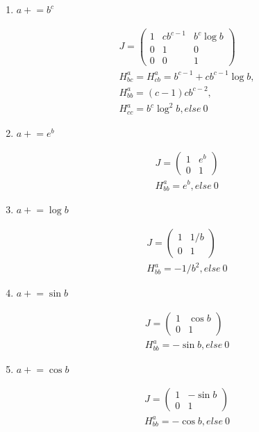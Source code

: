\documentclass{article}
\newcommand{\<}{\langle}
\renewcommand{\>}{\rangle}
\theoremstyle{definition}\newtheorem{definition}{\textit{Definition}}
\begin{document}
\begin{multicols}{2}
\begin{enumerate}
\item $a\mathrel+=b^c$


\begin{align*}
    &J = \left(\begin{matrix}
1 &  cb^{c-1} &   b^c \log b \\
0 & 1 & 0\\
0 & 0 & 1
\end{matrix}\right)\\
    &H^a_{bc} = H^a_{cb} = b^{c-1} + c b^{c-1}\log b,\\
    &H^a_{bb} = (c-1)c b^{c-2},\\
    &H^a_{cc} = b^c\log^2b, else ~0
\end{align*}

\item $a\mathrel+=e^b$

\begin{align*}
    &J = \left(\begin{matrix}
1 &  e^b \\
0 & 1
\end{matrix}\right)\\
    &H^a_{bb} = e^b, else ~0
\end{align*}

\item $a\mathrel+=\log b$

\begin{align*}
    &J = \left(\begin{matrix}
1 &  1/b \\
0 & 1
\end{matrix}\right)\\
    &H^a_{bb} = -1/b^2, else ~0
\end{align*}

\item $a\mathrel+=\sin b$

\begin{align*}
    &J = \left(\begin{matrix}
1 &  \cos b \\
0 & 1
\end{matrix}\right)\\
    &H^a_{bb} = -\sin b, else ~0
\end{align*}

\item $a\mathrel+=\cos b$

\begin{align*}
    &J = \left(\begin{matrix}
1 &  -\sin b \\
0 & 1
\end{matrix}\right)\\
    &H^a_{bb} = -\cos b, else ~0
\end{align*}


\end{enumerate}
\end{multicols}
\end{document}
